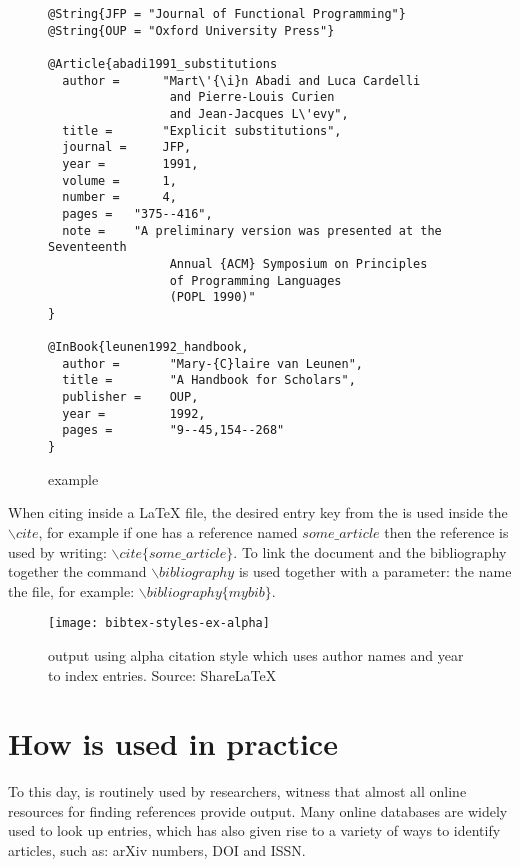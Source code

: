 \begin{figure}
  \centering
  \begin{small}
\begin{verbatim}
@String{JFP = "Journal of Functional Programming"}
@String{OUP = "Oxford University Press"}

@Article{abadi1991_substitutions
  author =      "Mart\'{\i}n Abadi and Luca Cardelli
                 and Pierre-Louis Curien
                 and Jean-Jacques L\'evy",
  title =       "Explicit substitutions",
  journal =     JFP,
  year =        1991,
  volume =      1,
  number =      4,
  pages =	"375--416",
  note =	"A preliminary version was presented at the Seventeenth
                 Annual {ACM} Symposium on Principles
                 of Programming Languages
                 (POPL 1990)"
}

@InBook{leunen1992_handbook,
  author =       "Mary-{C}laire van Leunen",
  title =        "A Handbook for Scholars",
  publisher =    OUP,
  year =         1992,
  pages =        "9--45,154--268"
}
\end{verbatim}
  \end{small}
  \caption{{\bibtex} example}
\label{fig:bibtex_example}
\end{figure}

When citing inside a {\LaTeX} file, the desired entry key from the
{\bibtex} is used inside the ${\backslash}cite$, for example if one
has a reference named $some\_article$ then the reference is used by
writing: ${\backslash}cite\{some\_article\}$.  To link the document
and the bibliography together the command ${\backslash}bibliography$
is used together with a parameter: the name the {\bibtex} file, for
example: ${\backslash}bibliography\{mybib\}$.

\begin{figure}
  \centering
  \texttt{[image: bibtex-styles-ex-alpha]}
  \caption{{\bibtex} output using alpha citation style which uses
    author names and year to index entries.  Source:
    ShareLaTeX~\cite{sharelatex2016_styles}}
\label{fig:bibtex_example_alpha}
\end{figure}


\section{How {\bibtex} is used in practice}
\label{sec:how_bibtex_is_used_today}

To this day, {\bibtex} is routinely used by researchers, witness that
almost all online resources for finding references provide {\bibtex}
output.  Many online databases are widely used to look up entries,
which has also given rise to a variety of ways to identify articles,
such as: arXiv numbers, DOI and ISSN.

